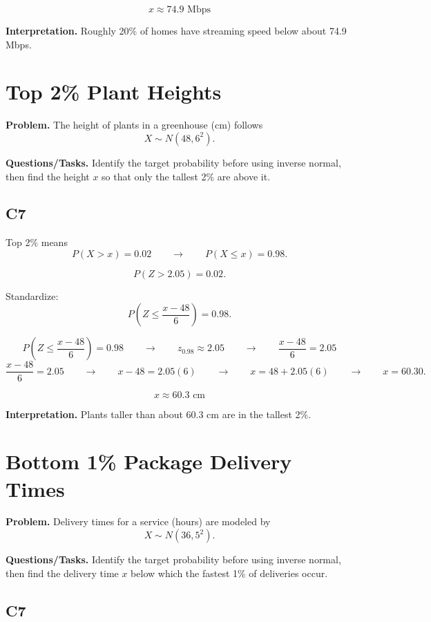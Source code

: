 	\[
	x \approx 74.9\text{ Mbps}
	\]
	
	\textbf{Interpretation.} Roughly 20\% of homes have streaming speed below about 74.9 Mbps.
	
	\section{Top 2\% Plant Heights}
	
	\textbf{Problem.} The height of plants in a greenhouse (cm) follows
	\[
	X \sim N(48, 6^2).
	\]
	
	\textbf{Questions/Tasks.} Identify the target probability before using inverse normal, then find the height $x$ so that only the tallest 2\% are above it.
	
	\subsection*{C7}
	
	Top 2\% means
	\[
	P(X > x) = 0.02
	\qquad \longrightarrow \qquad
	P(X \leq x) = 0.98.
	\]
	
	\[
	P(Z>2.05)=0.02.
	\]
	
	
	Standardize:
	\[
	P\left(Z \leq \frac{x - 48}{6}\right) = 0.98.
	\]
	
	\[
	P\left(Z \leq \frac{x - 48}{6}\right)=0.98
	\qquad \longrightarrow \qquad
	z_{0.98}\approx 2.05
	\qquad \longrightarrow \qquad
	\frac{x - 48}{6}=2.05
	\]
	\[
	\frac{x - 48}{6}=2.05
	\qquad \longrightarrow \qquad
	x-48=2.05(6)
	\qquad \longrightarrow \qquad
	x=48+2.05(6)
	\qquad \longrightarrow \qquad
	x=60.30.
	\]
	
	\[
	x \approx 60.3\text{ cm}
	\]
	
	\textbf{Interpretation.} Plants taller than about 60.3 cm are in the tallest 2\%.
	
	\section{Bottom 1\% Package Delivery Times}
	
	\textbf{Problem.} Delivery times for a service (hours) are modeled by
	\[
	X \sim N(36, 5^2).
	\]
	
	\textbf{Questions/Tasks.} Identify the target probability before using inverse normal, then find the delivery time $x$ below which the fastest 1\% of deliveries occur.
	
	\subsection*{C7}
	

